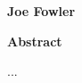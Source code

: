 \thispagestyle{plain}

\begin{center}
  \Large
  \textbf{\projecttitle}

  \vspace{0.4cm}
  \large \projectsubtitle

  \vspace{0.4cm}
  \textbf{Joe Fowler}

  \vspace{0.9cm}
  \textbf{Abstract}
\end{center}
{}
...
